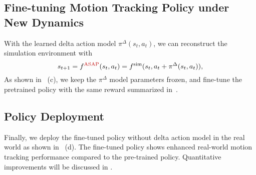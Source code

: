 \subsection{Fine-tuning Motion Tracking Policy under New Dynamics}
With the learned delta action model $\pi^\Delta (s_t, a_t)$, we can reconstruct the simulation environment with 
$$
s_{t+1} = f^{\text{\method}}(s_t, a_t) = f^\text{sim}(s_t, a_t + \pi^\Delta(s_t, a_t)),
$$
As shown in~ (c), we keep the $\pi^\Delta$ model parameters frozen, and fine-tune the pretrained policy with the same reward summarized in~. 






\subsection{Policy Deployment}
Finally, we deploy the fine-tuned policy without delta action model in the real world as shown in ~(d). The fine-tuned policy shows enhanced real-world motion tracking performance compared to the pre-trained policy. Quantitative improvements will be discussed in .